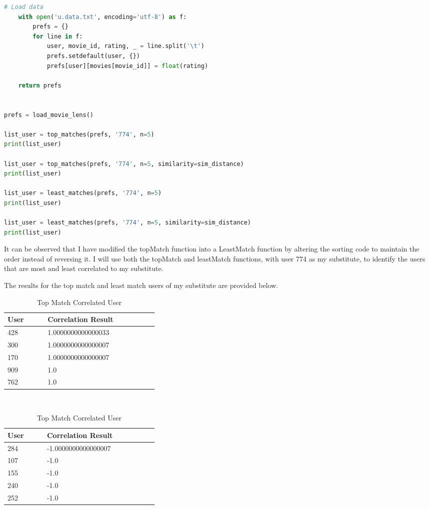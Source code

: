 \documentclass[12pt]{article}
\begin{document}
\begin{lstlisting}[language=Python, caption=Finding users with my preferences.]
    # Load data
    with open('u.data.txt', encoding='utf-8') as f:
        prefs = {}
        for line in f:
            user, movie_id, rating, _ = line.split('\t')
            prefs.setdefault(user, {})
            prefs[user][movies[movie_id]] = float(rating)

    return prefs


prefs = load_movie_lens()

list_user = top_matches(prefs, '774', n=5)
print(list_user)

list_user = top_matches(prefs, '774', n=5, similarity=sim_distance)
print(list_user)

list_user = least_matches(prefs, '774', n=5)
print(list_user)

list_user = least_matches(prefs, '774', n=5, similarity=sim_distance)
print(list_user)

\end{lstlisting}

It can be observed that I have modified the topMatch function into a LeastMatch function by altering the sorting code to maintain the order instead of reversing it. I will use both the topMatch and leastMatch functions, with user 774 as my substitute, to identify the users that are most and least correlated to my substitute.

The results for the top match and least match users of my substitute are provided below.

\begin{table}[h]
\centering
\caption{Top Match Correlated User}
\label{tbl:simple}
\begin{tabular}{p{0.10\linewidth}p{0.25\linewidth}}
\hline
\textbf{User} & \textbf{Correlation Result} \\ \hline \hline
428 & 1.0000000000000033 \\ \hline
300 & 1.0000000000000007 \\ \hline
170 & 1.0000000000000007 \\ \hline
909 & 1.0 \\ \hline
762 & 1.0 \\ \hline
\hline
\end{tabular}
\end{table}
\\

\begin{table}[h]
\centering
\caption{Top Match Correlated User}
\label{tbl:simple}
\begin{tabular}{p{0.10\linewidth}p{0.25\linewidth}}
\hline
\textbf{User} & \textbf{Correlation Result} \\ \hline \hline
284 & -1.0000000000000007 \\ \hline
107 & -1.0 \\ \hline
155 & -1.0 \\ \hline
240 & -1.0 \\ \hline
252 & -1.0 \\ \hline
\hline
\end{tabular}
\end{table}
\end{document}
